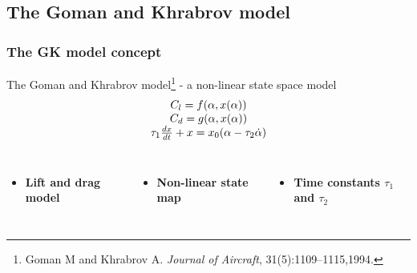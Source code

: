 \documentclass[compress]{beamer}
\begin{document}
\subsection{The Goman and Khrabrov model}

\begin{frame}
  \frametitle{The GK model concept}
  The Goman and Khrabrov model\footnote{Goman M and Khrabrov A. \emph{Journal of Aircraft}, 31(5):1109–1115,1994.} - a non-linear state space model
  \begin{equation*}
    \begin{array}[c]{c}
      C_l= f(\alpha,x(\alpha)) \\
      C_d= g(\alpha,x(\alpha)) \\
      \tau_1 \frac{dx}{dt} +x = x_0(\alpha - \tau_2 \dot{\alpha}) 
    \end{array}
  \end{equation*}

  \begin{columns}[t] 
      \begin{itemize}
      \item   \textbf{Lift and drag model}
    \end{itemize}
     \begin{itemize}
      \item    \textbf{Non-linear state map}
    \end{itemize}
    \begin{itemize}
      \item \textbf{Time constants $\tau_1$ and $\tau_2$} 
    \end{itemize}
  \end{columns}


\end{frame}
\end{document}
